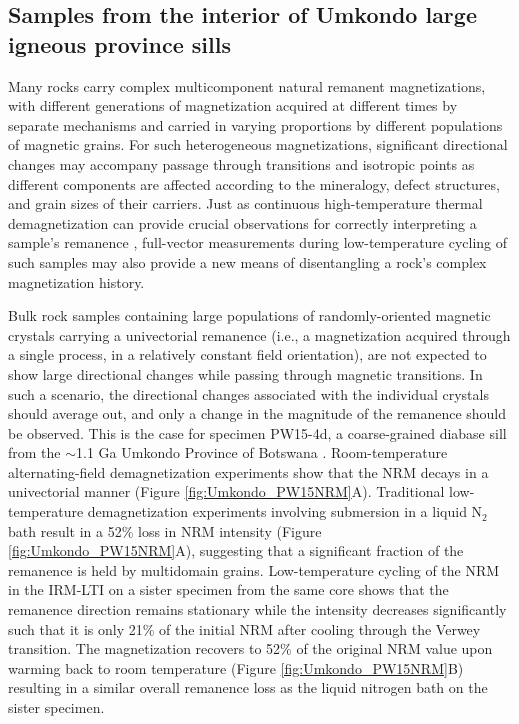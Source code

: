 \documentclass[draft,gc]{AGUTeX}
\begin{document}
\begin{article}
\subsection{Samples from the interior of Umkondo large igneous province sills}

Many rocks carry complex multicomponent natural remanent magnetizations, with different generations of magnetization acquired at different times by separate mechanisms and carried in varying proportions by different populations of magnetic grains. For such heterogeneous magnetizations, significant directional changes may accompany passage through transitions and isotropic points as different components are affected according to the mineralogy, defect structures, and grain sizes of their carriers. Just as continuous high-temperature thermal demagnetization can provide crucial observations for correctly interpreting a sample's remanence \citep{Wack2007a, Coe2014a}, full-vector measurements during low-temperature cycling of such samples may also provide a new means of disentangling a rock's complex magnetization history. 

Bulk rock samples containing large populations of randomly-oriented magnetic crystals carrying a univectorial remanence (i.e., a magnetization acquired through a single process, in a relatively constant field orientation), are not expected to show large directional changes while passing through magnetic transitions. In such a scenario, the directional changes associated with the individual crystals should average out, and only a change in the magnitude of the remanence should be observed. This is the case for specimen PW15-4d, a coarse-grained diabase sill from the $\sim$1.1 Ga Umkondo Province of Botswana \citep{Hanson2004a}. Room-temperature alternating-field demagnetization experiments show that the NRM decays in a univectorial manner (Figure \ref{fig:Umkondo_PW15NRM}A). Traditional low-temperature demagnetization experiments involving submersion in a liquid N$_{2}$ bath result in a 52\% loss in NRM intensity (Figure \ref{fig:Umkondo_PW15NRM}A), suggesting that a significant fraction of the remanence is held by multidomain grains. Low-temperature cycling of the NRM in the IRM-LTI on a sister specimen from the same core shows that the remanence direction remains stationary while the intensity decreases significantly such that it is only 21\% of the initial NRM after cooling through the Verwey transition. The magnetization recovers to 52\% of the original NRM value upon warming back to room temperature (Figure \ref{fig:Umkondo_PW15NRM}B) resulting in a similar overall remanence loss as the liquid nitrogen bath on the sister specimen.


\end{article}
\end{document}
